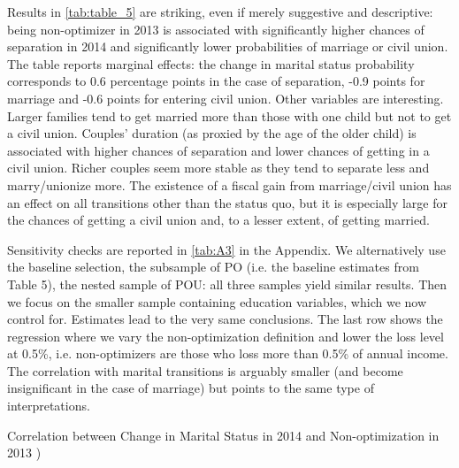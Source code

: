 \medskip
Results in \autoref{tab:table_5} are striking, even if merely suggestive and descriptive: being non-optimizer in 2013 is associated with significantly higher chances of separation in 2014 and significantly lower probabilities of marriage or civil union. The table reports marginal effects: the change in marital status probability corresponds to 0.6 percentage points in the case of separation, -0.9 points for marriage and -0.6 points for entering civil union. Other variables are interesting. Larger families tend to get married more than those with one child but not to get a civil union. Couples’ duration (as proxied by the age of the older child) is associated with higher chances of separation and lower chances of getting in a civil union. Richer couples seem more stable as they tend to separate less and marry/unionize more. The existence of a fiscal gain from marriage/civil union has an effect on all transitions other than the status quo, but it is especially large for the chances of getting a civil union and, to a lesser extent, of getting married.




\medskip
Sensitivity checks are reported in \autoref{tab:A3} in the Appendix. We alternatively use the baseline selection, the subsample of PO (i.e. the baseline estimates from Table 5), the nested sample of POU: all three samples yield similar results. Then we focus on the smaller sample containing education variables, which we now control for. Estimates lead to the very same conclusions. The last row shows the regression where we vary the non-optimization definition and lower the loss level at 0.5\%, i.e. non-optimizers are those who loss more than 0.5\% of annual income. The correlation with marital transitions is arguably smaller (and become insignificant in the case of marriage) but points to the same type of interpretations.


  \begin{table}[H]
  \caption{Correlation between Change in Marital Status in 2014 and Non-optimization in 2013 )
}
  \label{tab:table_5}
  \end{table}

